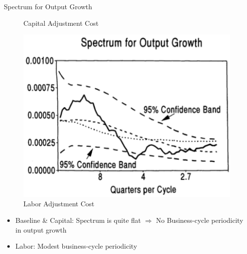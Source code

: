\documentclass[10pt]{beamer}
\begin{document}
\begin{frame}{Spectrum for Output Growth}
\begin{minipage}{0.33\textwidth}
\begin{figure}
  \caption{Capital Adjustment Cost}
\end{figure}
\end{minipage}%
\begin{minipage}{0.33\textwidth}
\begin{figure}
  \centering
  \includegraphics[width=\linewidth]{L_spect.png}
  \caption{Labor Adjustment Cost}
\end{figure}
\end{minipage}

\begin{itemize}
    \item Baseline \& Capital: Spectrum is quite flat $\Rightarrow$ No Business-cycle periodicity in output growth
    \item Labor: Modest business-cycle periodicity
\end{itemize}

\end{frame}
\end{document}
